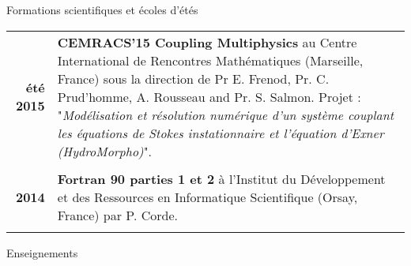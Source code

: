 \documentclass[10pt,a4paper]{report}
\def\cvpart{\noindent \hrulefill}
\def\sp{\vspace{6mm}}
\begin{document}
\newpage
\sp
{\selectfont
\begin{Large}
Formations scientifiques et écoles d'étés
\end{Large}
\cvpart
}
\sp

\begin{center}
\begin{tabular}{r p{12cm}}
\textbf{été 2015} & \textbf{CEMRACS'15 Coupling Multiphysics} au Centre International de Rencontres Mathématiques (Marseille, France) sous la direction de Pr E. Frenod, Pr. C. Prud'homme, A. Rousseau and Pr. S. Salmon.\newline
Projet : "\textit{Modélisation et résolution numérique d'un système couplant les équations de Stokes instationnaire et l'équation d'Exner (HydroMorpho)}".\\

& \\

\textbf{2014} & \textbf{Fortran 90 parties 1 et 2} à l'Institut du Développement et des Ressources en Informatique Scientifique (Orsay, France) par P. Corde.\\

& \\

\end{tabular}
\end{center}

















\sp
{\selectfont
\begin{Large}
Enseignements
\end{Large}
\cvpart
}
\sp
\end{document}
